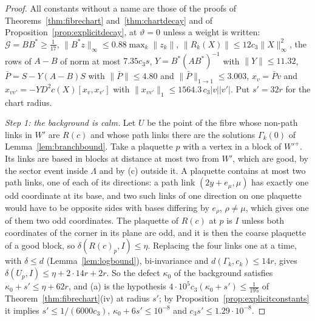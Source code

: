 \documentclass[11pt]{amsart}
\theoremstyle{definition}
\theoremstyle{remark}
\numberwithin{equation}{section}
\begin{document}
\begin{proof}
All constants without a name are those of the proofs of
Theorems~\ref{thm:fibrechart} and~\ref{thm:chartdecay} and of
Proposition~\ref{prop:explicitdecay}, at $\vartheta=0$ unless a weight is
written: $\mathcal G=BB^*\ge\frac1{17}$, $\lVert B^*z\rVert_\infty\le0.88
\max_k\lVert z_k\rVert$, $\lVert R_k(X)\rVert\le12c_3\lVert X
\rVert_\infty^2$, the rows of $A-B$ of norm at most $7.35c_3s$,
$Y=B^*(AB^*)^{-1}$ with $\lVert Y\rVert\le11.32$, $\bar P=S-Y(A-B)S$ with
$\lVert\bar P\rVert\le4.80$ and $\lVert\bar P\rVert_{1\to1}\le3.003$,
$x_v=\bar Pv$ and $x_{vv'}=-YD^2c(X)[x_v,x_{v'}]$ with
$\lVert x_{vv'}\rVert_1\le1564.3\,c_3\lvert v\rvert\lvert v'\rvert$. Put
$s'=32r$ for the chart radius.

\emph{Step 1: the background is calm.} Let $U$ be the point of the fibre
whose non-path links in $W'$ are $R(c)$ and whose path links there are
the solutions $\Gamma_k(0)$ of Lemma~\ref{lem:branchbound}. Take a
plaquette $p$ with a vertex in a block of $W'^+$. Its links are based in
blocks at distance at most two from $W'$, which are good, by the sector
event inside $\Lambda$ and by (c) outside it. A plaquette contains at most
two path links, one of each of its directions: a path link $(2y+e_\mu,\mu)$
has exactly one odd coordinate at its base, and two such links of one
direction on one plaquette would have to be opposite sides with bases
differing by $e_\rho$, $\rho\ne\mu$, which gives one of them two odd
coordinates. The plaquette of $R(c)$ at
$p$ is $I$ unless both coordinates of the corner in its plane are odd, and
it is then the coarse plaquette of a good block, so
$\delta(R(c)_p,I)\le\eta$. Replacing the four links one at a time, with
$\delta\le d$ (Lemma~\ref{lem:logbound}), bi-invariance and
$d(\Gamma_k,c_k)\le14r$, gives $\delta(U_p,I)\le\eta+2\cdot14r+2r$. So the
defect $\kappa_0$ of the background satisfies
$\kappa_0+s'\le\eta+62r$, and (a) is the hypothesis
$4\cdot10^5c_3(\kappa_0+s')\le\frac1{195}$ of
Theorem~\ref{thm:fibrechart}(iv) at radius $s'$; by
Proposition~\ref{prop:explicitconstants} it implies $s'\le1/(6000c_3)$,
$\kappa_0+6s'\le10^{-8}$ and $c_3s'\le1.29\cdot10^{-8}$.


\end{proof}
\end{document}
